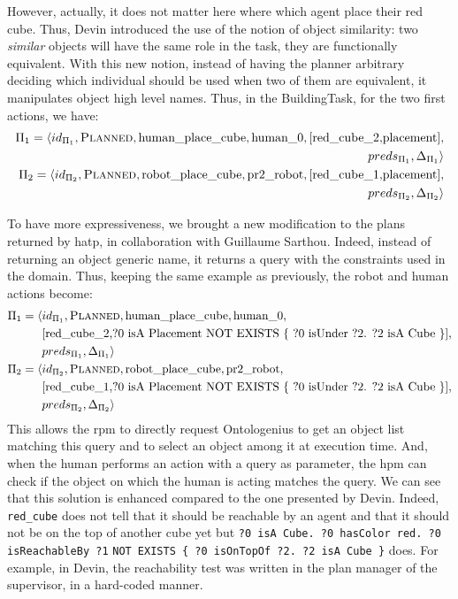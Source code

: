 \documentclass[a4paper,11pt,twoside]{StyleThese}
\begin{document}
However, actually, it does not matter here where which agent place their red cube. Thus, Devin introduced the use of the notion of object similarity: two \emph{similar} objects will have the same role in the task, they are functionally equivalent. With this new notion, instead of having the planner arbitrary deciding which individual should be used when two of them are equivalent, it manipulates object high level names. Thus, in the BuildingTask, for the two first actions, we have:
\begin{align*}
\Pi_1=\langle id_{\Pi_1},\textsc{Planned},\text{human\_place\_cube},\text{human\_0}, [\text{red\_cube\_2,placement}],&\\ preds_{\Pi_1},\Delta_{\Pi_1}\rangle&\\
\Pi_2=\langle id_{\Pi_2},\textsc{Planned},\text{robot\_place\_cube},\text{pr2\_robot}, [\text{red\_cube\_1,placement}],&\\ preds_{\Pi_2},\Delta_{\Pi_2}\rangle&
\end{align*}

To have more expressiveness, we brought a new modification to the plans returned by \acrshort{hatp}, in collaboration with Guillaume Sarthou. Indeed, instead of returning an object generic name, it returns a \sparql{} query with the constraints used in the domain. Thus, keeping the same example as previously, the robot and human actions become:
\begin{align*}
\Pi_1=\langle & id_{\Pi_1},\textsc{Planned},\text{human\_place\_cube},\text{human\_0}, \\
&{}[\text{red\_cube\_2,?0 isA Placement NOT EXISTS \{ ?0 isUnder ?2. ?2 isA Cube \}}],\\ &preds_{\Pi_1},\Delta_{\Pi_1}\rangle\\
\Pi_2=\langle & id_{\Pi_2},\textsc{Planned},\text{robot\_place\_cube},\text{pr2\_robot}, \\
&{}[\text{red\_cube\_1,?0 isA Placement NOT EXISTS \{ ?0 isUnder ?2. ?2 isA Cube \}}],\\  &preds_{\Pi_2},\Delta_{\Pi_2}\rangle
\end{align*}
\thispagestyle{example}
This allows the \acrshort{rpm} to directly request Ontologenius to get an object list matching this query and to select an object among it at execution time. And, when the human performs an action with a \sparql{} query as parameter, the \acrshort{hpm} can check if the object on which the human is acting matches the query. We can see that this solution is enhanced compared to the one presented by Devin. Indeed, \verb'red_cube' does not tell that it should be reachable by an agent and that it should not be on the top of another cube yet but \verb'?0 isA Cube. ?0 hasColor red. ?0 isReachableBy ?1' \verb'NOT EXISTS { ?0 isOnTopOf ?2. ?2 isA Cube }' does. For example, in Devin, the reachability test was written in the plan manager of the supervisor, in a hard-coded manner. 
\end{document}
